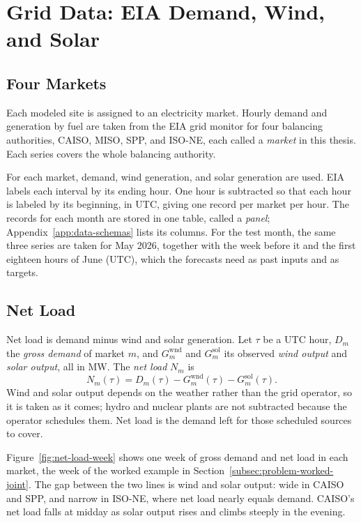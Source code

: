 \documentclass{UNCC-thesis}
\begin{document}
\section{Grid Data: EIA Demand, Wind, and Solar}
\label{sec:energy-data}

\subsection{Four Markets}
\label{subsec:energy-sources}

Each modeled site is assigned to an electricity market. Hourly demand and
generation by fuel are taken from the EIA grid monitor \cite{eiaGridMonitor}
for four balancing authorities, CAISO, MISO, SPP, and ISO-NE, each called a
\emph{market} in this thesis. Each series covers the whole balancing
authority.

For each market, demand, wind generation, and solar generation are used.
EIA labels each interval by its ending hour. One hour is subtracted so that
each hour is labeled by its beginning, in UTC, giving one record per market
per hour. The records for each month are stored in one table, called a
\emph{panel}; Appendix~\ref{app:data-schemas} lists its columns. For the test
month, the same three series are taken for May 2026, together with the week
before it and the first eighteen hours of June (UTC), which the forecasts need as
past inputs and as targets. 

\subsection{Net Load}
\label{subsec:energy-net-load}

Net load is demand minus wind and solar generation. Let \(\tau\) be a UTC
hour, \(D_m\) the \emph{gross demand} of market \(m\), and
\(G^{\mathrm{wnd}}_m\) and \(G^{\mathrm{sol}}_m\) its observed \emph{wind
output} and \emph{solar output}, all in MW. The \emph{net load} \(N_m\) is
\begin{equation}
  N_m(\tau)
  =
  D_m(\tau)
  -G^{\mathrm{wnd}}_m(\tau)
  -G^{\mathrm{sol}}_m(\tau).
  \label{eq:energy-net-load}
\end{equation}
Wind and solar output depends on the weather rather than the grid operator,
so it is taken as it comes; hydro and nuclear plants are not subtracted
because the operator schedules them. Net load is the demand left for those
scheduled sources to cover.

Figure~\ref{fig:net-load-week} shows one week of gross demand and net load
in each market, the week of the worked example in
Section~\ref{subsec:problem-worked-joint}. The gap between the two lines is
wind and solar output: wide in CAISO and SPP, and narrow in ISO-NE, where
net load nearly equals demand. CAISO's net load falls at midday as solar
output rises and climbs steeply in the evening.
\end{document}
